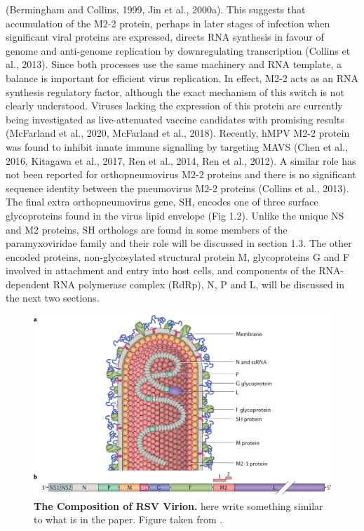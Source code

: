 (Bermingham and Collins, 1999, Jin et al., 2000a). This suggests that accumulation of the M2-2 protein, perhaps in later stages of infection when significant viral proteins are expressed, directs RNA synthesis in favour of genome and anti-genome replication by downregulating transcription (Collins et al., 2013). Since both processes use the same machinery and RNA template, a balance is important for efficient virus replication. In effect, M2-2 acts as an RNA synthesis regulatory factor, although the exact mechanism of this switch is not clearly understood. Viruses lacking the expression of this protein are currently being investigated as live-attenuated vaccine candidates with promising results (McFarland et al., 2020, McFarland et al., 2018). Recently, hMPV M2-2 protein was found to inhibit innate immune signalling by targeting MAVS (Chen et al., 2016, Kitagawa et al., 2017, Ren et al., 2014, Ren et al., 2012). A similar role has not been reported for orthopneumovirus M2-2 proteins and there is no significant sequence identity between the pneumovirus M2-2 proteins (Collins et al., 2013). The final extra orthopneumovirus gene, SH, encodes one of three surface glycoproteins found in the virus lipid envelope (Fig 1.2). Unlike the unique NS and M2 proteins, SH orthologs are found in some members of the paramyxoviridae family and their role will be discussed in section 1.3. The other encoded proteins, non-glycosylated structural protein M, glycoproteins G and F involved in attachment and entry into host cells, and components of the RNA-dependent RNA polymerase complex (RdRp), N, P and L, will be discussed in the next two sections.

\begin{figure}
    \centering
    \includegraphics[width=1\linewidth]{04. Introduction//Figs/07. RSV-composition.png}
    \caption[The Composition of RSV Virion.]{\textbf{The Composition of RSV Virion.} here write something similar to what is in the paper. Figure taken from \cite{Battles2019RespiratoryIt}.}
    \label{fig:The Composition of RSV Virion}
\end{figure}

